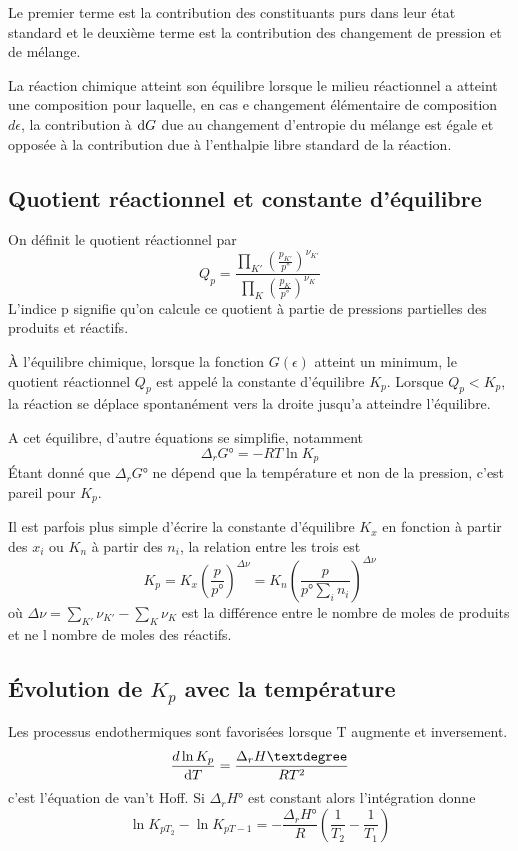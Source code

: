 Le premier terme est la contribution des constituants purs
dans leur état standard et le deuxième terme est
la contribution des changement de pression et de mélange.

La réaction chimique atteint son équilibre lorsque le milieu réactionnel
a atteint une composition pour laquelle, en cas e changement élémentaire
de composition $d\epsilon$, la contribution à $\operatorname{d}\! G$ due au changement
d'entropie du mélange est égale et opposée à la contribution due à
l'enthalpie libre standard de la réaction.

\subsection{Quotient réactionnel et constante d'équilibre}
On définit le quotient réactionnel par
\[ Q_p = \frac {\prod_{K'}\left(\frac{p_{K'}}{p°}\right)^{\nu_{K'}}}
{\prod_{K}\left(\frac{p_{K}}{p°}\right)^{\nu_{K}}} \]
L'indice p signifie qu'on calcule ce quotient à partie de pressions partielles
des produits et réactifs.

À l'équilibre chimique, lorsque la fonction $G(\epsilon)$ atteint un minimum,
le quotient réactionnel $Q_p$ est appelé la constante d'équilibre $K_p$.
Lorsque $Q_p < K_p$, la réaction se déplace spontanément
vers la droite jusqu'a atteindre l'équilibre.

A cet équilibre, d'autre équations se simplifie, notamment
\[ \Delta_rG° = -RT\ln K_p \]
Étant donné que $\Delta_rG°$ ne dépend que la température et
non de la pression, c'est pareil pour $K_p$.

Il est parfois plus simple d'écrire la constante d'équilibre $K_x$
en fonction à partir des $x_i$ ou $K_n$ à partir des $n_i$,
la relation entre les trois est
\[ K_p = K_x\left(\frac{p}{p°}\right)^{\Delta \nu} =
K_n \left(\frac{p}{p°\sum_i n_i}\right)^{\Delta \nu} \]
où $\Delta \nu = \sum_{K'}\nu_{K'}-\sum_K \nu_K$ est la différence entre
le nombre de moles de produits et ne l nombre de moles des réactifs.

\subsection{Évolution de $K_p$ avec la température}
Les processus endothermiques sont favorisées lorsque T augmente et inversement.
\[ \frac {d \ln K_p}{\dif T} = \frac{\Delta_rH°}{RT^2} \]
c'est l'équation de van't Hoff.
Si $\Delta_rH°$ est constant alors l'intégration donne
\[ \ln K_{pT_2}-\ln K_{pT-1} = -\frac{\Delta_rH°}{R}\left(\frac{1}{T_2}-
\frac{1}{T_1}\right) \]

